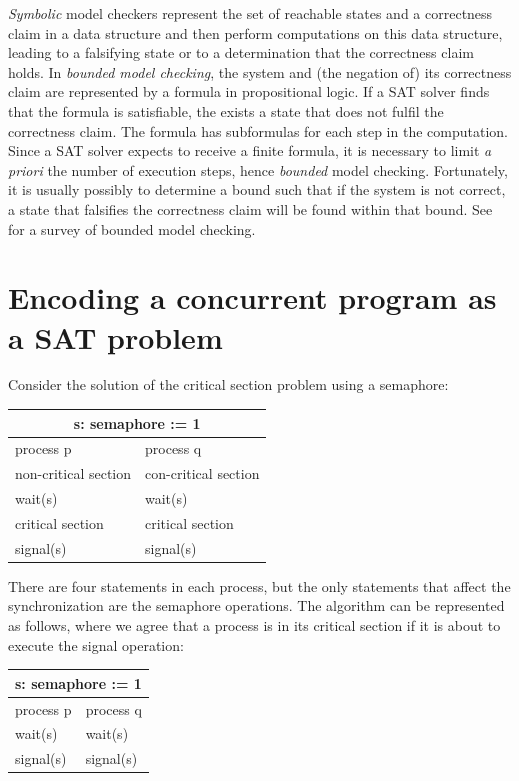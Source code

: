 \documentclass[11pt]{report}
\begin{document}
\emph{Symbolic} model checkers represent the set of reachable states and
a correctness claim in a data structure and then perform computations on
this data structure, leading to a falsifying state or to a determination
that the correctness claim holds. In \emph{bounded model checking}, the
system and (the negation of) its correctness claim are represented by a
formula in propositional logic. If a SAT solver finds that the formula
is satisfiable, the exists a state that does not fulfil the correctness
claim. The formula has subformulas for each step in the computation.
Since a SAT solver expects to receive a finite formula, it is necessary
to limit \textit{a priori} the number of execution steps, hence
\emph{bounded} model checking. Fortunately, it is usually possibly to
determine a bound such that if the system is not correct, a state that
falsifies the correctness claim will be found within that bound. See
\cite{bmc} for a survey of bounded model checking.

\newpage

\section{Encoding a concurrent program as a SAT problem}

Consider the solution of the critical section problem using a semaphore:

\begin{center}
\begin{tabular}{|l|l|}
\hline
\multicolumn{2}{|c|}{s: semaphore := 1}\\\hline
process p & process q\\\hline
non-critical section & con-critical section \\
wait(s) & wait(s) \\
critical section & critical section \\
signal(s) & signal(s)\\\hline
\end{tabular}
\end{center}

There are four statements in each process, but the only statements that
affect the synchronization are the semaphore operations. The algorithm
can be represented as follows, where we agree that a process is in its
critical section if it is about to execute the signal operation:

\begin{center}
\begin{tabular}{|l|l|}
\hline
\multicolumn{2}{|c|}{s: semaphore := 1}\\\hline
process p & process q\\\hline
wait(s) & wait(s) \\
signal(s) & signal(s)\\\hline
\end{tabular}
\end{center}
\end{document}
